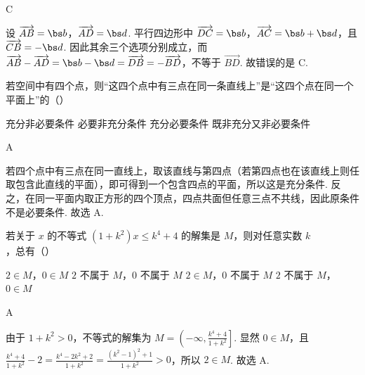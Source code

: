 \begin{answer}
C
\end{answer}

\begin{solution}
设 \(\overrightarrow{AB}=\bs b\)，\(\overrightarrow{AD}=\bs d\). 平行四边形中 \(\overrightarrow{DC}=\bs b\)，\(\overrightarrow{AC}=\bs b+\bs d\)，且 \(\overrightarrow{CB}=-\bs d\). 因此其余三个选项分别成立，而
\(\overrightarrow{AB}-\overrightarrow{AD}=\bs b-\bs d=\overrightarrow{DB}=-\overrightarrow{BD}\)，不等于 \(\overrightarrow{BD}\). 故错误的是 C.
\end{solution}

\begin{problem}
若空间中有四个点，则“这四个点中有三点在同一条直线上”是“这四个点在同一个平面上”的（\quad）

\choices
    {充分非必要条件}
    {必要非充分条件}
    {充分必要条件}
    {既非充分又非必要条件}
\end{problem}

\begin{answer}
A
\end{answer}

\begin{solution}
若四个点中有三点在同一直线上，取该直线与第四点（若第四点也在该直线上则任取包含此直线的平面），即可得到一个包含四点的平面，所以这是充分条件. 反之，在同一平面内取正方形的四个顶点，四点共面但任意三点不共线，因此原条件不是必要条件. 故选 A.
\end{solution}

\begin{problem}
若关于 \(x\) 的不等式 \((1 + k^2)x \leqslant k^4 + 4\) 的解集是 \(M\)，则对任意实数 \(k\)，总有（\quad）

\choices
    {\(2 \in M\)，\(0 \in M\)}
    {\(2\) 不属于 \(M\)，\(0\) 不属于 \(M\)}
    {\(2 \in M\)，\(0\) 不属于 \(M\)}
    {\(2\) 不属于 \(M\)，\(0 \in M\)}
\end{problem}

\begin{answer}
A
\end{answer}

\begin{solution}
由于 \(1+k^2>0\)，不等式的解集为
\(M=\left(-\infty,\frac{k^4+4}{1+k^2}\right]\). 显然 \(0\in M\)，且
\(\displaystyle \frac{k^4+4}{1+k^2}-2=\frac{k^4-2k^2+2}{1+k^2}=\frac{(k^2-1)^2+1}{1+k^2}>0\)，所以 \(2\in M\). 故选 A.
\end{solution}

